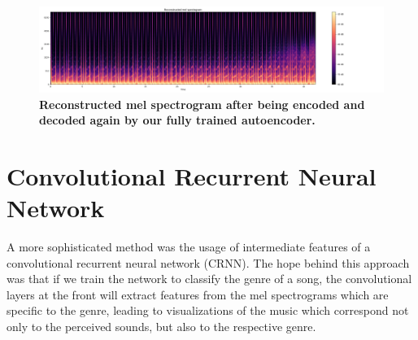     \begin{figure}
        \centering
        \includegraphics[width=\textwidth, trim=10 0 220 0, clip]{images/recon_spec}
        \caption{\textbf{Reconstructed mel spectrogram after being encoded and decoded again by our fully trained autoencoder.}}
        \label{reconstructed}
    \end{figure}
    
\section{Convolutional Recurrent Neural Network}

    A more sophisticated method was the usage of intermediate features of a convolutional recurrent neural network (CRNN).
    The hope behind this approach was that if we train the network to classify the genre of a song, the convolutional layers at the front will extract features from the mel spectrograms which are specific to the genre, leading to visualizations of the music which correspond not only to the perceived sounds, but also to the respective genre.\\

